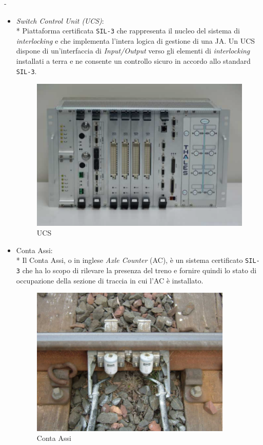 -\begin{itemize}
		\item \emph{Switch Control Unit (UCS)}:\\*
		Piattaforma certificata \texttt{SIL-3} \cite{sil} che rappresenta il nucleo del sistema di \emph{interlocking} e che implementa l'intera logica di gestione di una JA. Un UCS dispone di un'interfaccia di \emph{Input/Output} verso gli elementi di \emph{interlocking} installati a terra e ne consente un controllo sicuro in accordo allo standard \texttt{SIL-3}.
	\begin{figure}[h]
		\centering
				\includegraphics[width=0.7\linewidth]{img/ucs}
				\caption{UCS}
				\label{fig:ucs}
		\end{figure}\clearpage
		\item Conta Assi:\\*
		Il Conta Assi, o in inglese \emph{Axle Counter} (AC), \`e un sistema certificato \texttt{SIL-3} che ha lo scopo di rilevare la presenza del treno e fornire quindi lo stato di occupazione della sezione di traccia in cui l'AC \`e installato.
	\begin{figure}[h]
			\centering
			\includegraphics[width=0.7\linewidth,height=7.1cm]{img/axlecounter}
			\caption{Conta Assi}
			\label{fig:ac}

\end{figure}
\end{itemize}
